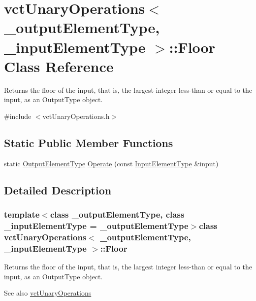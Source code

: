 \hypertarget{classvct_unary_operations_1_1_floor}{}\section{vct\+Unary\+Operations$<$ \+\_\+output\+Element\+Type, \+\_\+input\+Element\+Type $>$\+:\+:Floor Class Reference}
\label{classvct_unary_operations_1_1_floor}


Returns the floor of the input, that is, the largest integer less-\/than or equal to the input, as an Output\+Type object.  




{\ttfamily \#include $<$vct\+Unary\+Operations.\+h$>$}

\subsection*{Static Public Member Functions}
\begin{DoxyCompactItemize}
\item 
static \hyperlink{classvct_unary_operations_a42306ac3dd20d32c6d6c66ac3fa2e7b9}{Output\+Element\+Type} \hyperlink{classvct_unary_operations_1_1_floor_a764908396e241a3b9505b453f75cd54f}{Operate} (const \hyperlink{classvct_unary_operations_abf3b77bb7b8abd7ba72a6a45a65696a7}{Input\+Element\+Type} \&input)
\end{DoxyCompactItemize}


\subsection{Detailed Description}
\subsubsection*{template$<$class \+\_\+output\+Element\+Type, class \+\_\+input\+Element\+Type = \+\_\+output\+Element\+Type$>$class vct\+Unary\+Operations$<$ \+\_\+output\+Element\+Type, \+\_\+input\+Element\+Type $>$\+::\+Floor}

Returns the floor of the input, that is, the largest integer less-\/than or equal to the input, as an Output\+Type object. 

\begin{DoxySeeAlso}{See also}
\hyperlink{classvct_unary_operations}{vct\+Unary\+Operations} 
\end{DoxySeeAlso}


